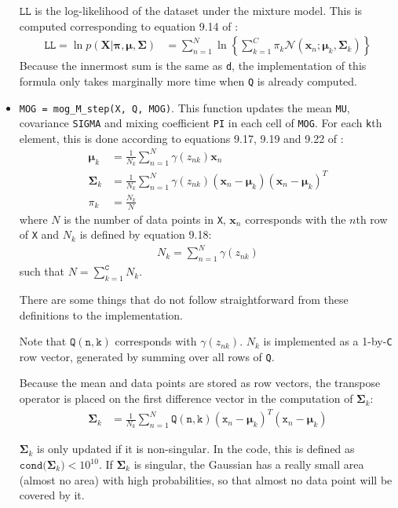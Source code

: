 \documentclass[a4paper,11pt]{article}
\newcommand{\V}[1]{\ensuremath{\mathbf{#1}}}
\newcommand{\T}[1]{\ensuremath{\mathtt{#1}}}
\newcommand{\muk}{\ensuremath{\boldsymbol{\mu}_k}}
\newcommand{\mean}{\ensuremath{\boldsymbol{\mu}}}
\newcommand{\cov}{\ensuremath{\boldsymbol{\Sigma}}}
\newcommand{\covk}{\ensuremath{\boldsymbol{\Sigma}_k}}
\newcommand{\mck}{\ensuremath{\pi_{k}}}
\newcommand{\mc}{\ensuremath{\boldsymbol{\pi}}}
\begin{document}
\begin{itemize}
$\T{LL}$ is the log-likelihood of the dataset under the mixture model.  This is computed corresponding to equation 9.14 of \cite{Bishop}:
\begin{align*}
\T{LL} = \ln p(\V{X} | \mc, \mean, \cov) &= \sum_{n=1}^{N} \ln \left\{ \sum_{k=1}^{C} \mck \mathcal{N}(\V{x}_n ; \muk, \covk) \right\}
\end{align*}
Because the innermost sum is the same as \texttt{d}, the implementation of this formula only takes marginally more time when \texttt{Q} is already computed.
%
\item \texttt{MOG = mog\_M\_step(X, Q, MOG)}.  This function updates the mean \texttt{MU}, covariance \texttt{SIGMA} and mixing coefficient \texttt{PI} in each cell of \texttt{MOG}.  For each \texttt{k}th element, this is done according to equations 9.17, 9.19 and 9.22 of \cite{Bishop}:
\begin{align*}
\muk &= \frac{1}{N_k} \sum_{n=1}^{N} \gamma(z_{nk}) \V{x}_n \\
\covk &= \frac{1}{N_k} \sum_{n=1}^{N} \gamma(z_{nk}) (\V{x}_n - \muk) (\V{x}_n - \muk)^T \\
\mck &= \frac{N_k}{N}
\end{align*}
where $N$ is the number of data points in \texttt{X}, $\V{x}_n$ corresponds with the $n$th row of \texttt{X} and $N_k$ is defined by equation 9.18:
\begin{align*}
N_k = \sum_{n=1}^{N} \gamma(z_{nk})
\end{align*}
such that $N = \sum_{k=1}^{\T{C}} N_k$.

There are some things that do not follow straightforward from these definitions to the implementation.  

Note that $\T{Q(n,k)}$ corresponds with $\gamma(z_{nk})$. $N_k$ is implemented as a 1-by-\texttt{C} row vector, generated by summing over all rows of \texttt{Q}.

Because the mean and data points are stored as row vectors, the transpose operator is placed on the first difference vector in the computation of $\covk$:
\begin{align*}
\covk &= \frac{1}{N_k} \sum_{n=1}^{N} \T{Q(n,k)} (\T{x}_n - \muk)^T (\T{x}_n - \muk)
\end{align*}

$\covk$ is only updated if it is non-singular.  In the code, this is defined as $\T{cond(}\covk\T{)} < 10^{10}$.  If $\covk$ is singular, the Gaussian has a really small area (almost no area) with high probabilities, so that almost no data point will be covered by it.

\end{itemize}
\end{document}
